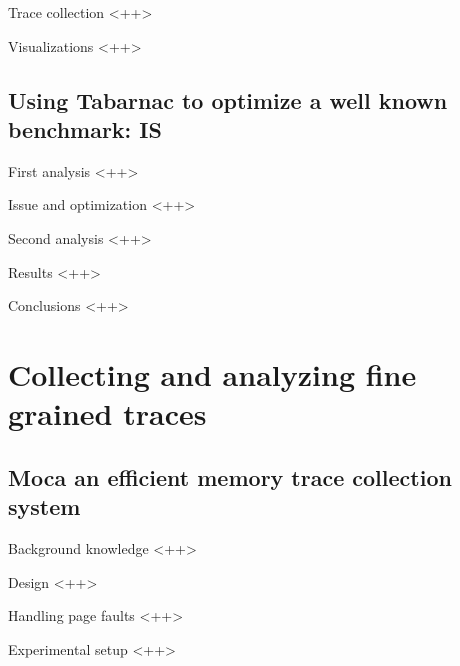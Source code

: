 \documentclass[xcolor={usenames,dvipsnames},hyperref={pdfusetitle}]{beamer}
\begin{document}
\begin{frame}{Trace collection}
    <++>
\end{frame}

\begin{frame}{Visualizations}
    <++>
\end{frame}

\subsection{Using Tabarnac to optimize a well known benchmark: IS}

\begin{frame}{First analysis}
    <++>
\end{frame}

\begin{frame}{Issue and optimization}
    <++>
\end{frame}

\begin{frame}{Second analysis}
    <++>
\end{frame}

\begin{frame}{Results}
    <++>
\end{frame}

\begin{frame}{Conclusions}
    <++>
\end{frame}

\section{Collecting and analyzing fine grained traces}

\subsection{Moca an efficient memory trace collection system}

\begin{frame}{Background knowledge}
    <++>
\end{frame}

\begin{frame}{Design}
    <++>
\end{frame}

\begin{frame}{Handling page faults}
    <++>
\end{frame}


\begin{frame}{Experimental setup}
    <++>
\end{frame}
\end{document}
